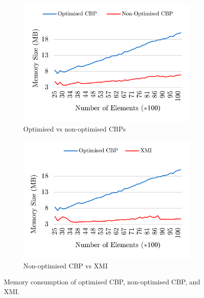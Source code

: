 \documentclass{llncs}
\begin{document}

\begin{figure}[ht]	
	\begin{subfigure}[t]{0.5\linewidth}
		\includegraphics[width=\linewidth]{memory_use_conf}
		\caption{Optimised vs non-optimised CBPs}\label{fig:memory_use_conf_ocbp_xmi}		
	\end{subfigure}
	\hfill
	\begin{subfigure}[t]{0.5\linewidth}
		\includegraphics[width=\linewidth]{memory_use_conf_cbp_xmi}
		\caption{Non-optimised CBP vs XMI}\label{fig:memory_use_conf_cbp_xmi}
	\end{subfigure}
	\caption{Memory consumption of optimised CBP, non-optimised CBP, and XMI.}
	\label{fig:memory_use}
\end{figure}
\end{document}
